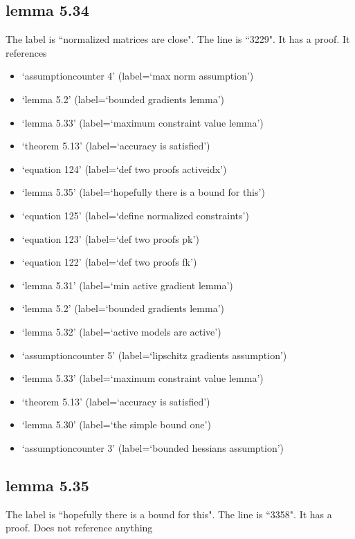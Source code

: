 \documentclass{article}
\begin{document}
\subsection{lemma 5.34}
The label is ``normalized matrices are close".
The line is ``3229".
It has a proof.
It references \begin{itemize}
\item `assumptioncounter 4' (label=`max norm assumption')
\item `lemma 5.2' (label=`bounded gradients lemma')
\item `lemma 5.33' (label=`maximum constraint value lemma')
\item `theorem 5.13' (label=`accuracy is satisfied')
\item `equation 124' (label=`def two proofs activeidx')
\item `lemma 5.35' (label=`hopefully there is a bound for this')
\item `equation 125' (label=`define normalized constraints')
\item `equation 123' (label=`def two proofs pk')
\item `equation 122' (label=`def two proofs fk')
\item `lemma 5.31' (label=`min active gradient lemma')
\item `lemma 5.2' (label=`bounded gradients lemma')
\item `lemma 5.32' (label=`active models are active')
\item `assumptioncounter 5' (label=`lipschitz gradients assumption')
\item `lemma 5.33' (label=`maximum constraint value lemma')
\item `theorem 5.13' (label=`accuracy is satisfied')
\item `lemma 5.30' (label=`the simple bound one')
\item `assumptioncounter 3' (label=`bounded hessians assumption')
\end{itemize}
\subsection{lemma 5.35}
The label is ``hopefully there is a bound for this".
The line is ``3358".
It has a proof.
Does not reference anything
\end{document}
